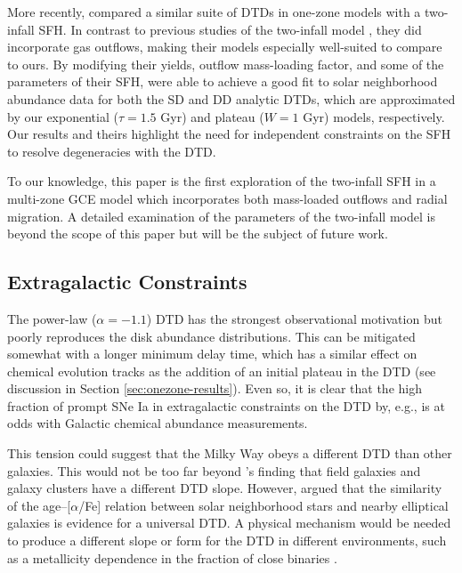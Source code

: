 \documentclass[twocolumn,twocolappendix]{aastex631}
\newcommand{\aFe}{[$\alpha$/Fe]\xspace}
\begin{document}
More recently, \citet{Palicio2023-AnalyticDTD} compared a similar suite of DTDs in one-zone models with a two-infall SFH. In contrast to previous studies of the two-infall model \citep[e.g.,][]{Chiappini1997-TwoInfall,Matteucci2009-DTDModels,Spitoni2021-TwoInfall}, they did incorporate gas outflows, making their models especially well-suited to compare to ours. By modifying their yields, outflow mass-loading factor, and some of the parameters of their SFH, \citet{Palicio2023-AnalyticDTD} were able to achieve a good fit to solar neighborhood abundance data for both the SD and DD analytic DTDs, which are approximated by our exponential ($\tau=1.5$ Gyr) and plateau ($W=1$ Gyr) models, respectively. Our results and theirs highlight the need for independent constraints on the SFH to resolve degeneracies with the DTD.

To our knowledge, this paper is the first exploration of the two-infall SFH in a multi-zone GCE model which incorporates both mass-loaded outflows and radial migration. A detailed examination of the parameters of the two-infall model is beyond the scope of this paper but will be the subject of future work.

\subsection{Extragalactic Constraints}

The power-law ($\alpha=-1.1$) DTD has the strongest observational motivation but poorly reproduces the disk abundance distributions. This can be mitigated somewhat with a longer minimum delay time, which has a similar effect on chemical evolution tracks as the addition of an initial plateau in the DTD (see discussion in Section \ref{sec:onezone-results}). Even so, it is clear that the high fraction of prompt SNe Ia in extragalactic constraints on the DTD by, e.g., \citet{Maoz2017-CosmicDTD} is at odds with Galactic chemical abundance measurements. 

This tension could suggest that the Milky Way obeys a different DTD than other galaxies. This would not be too far beyond \citeauthor{Maoz2017-CosmicDTD}'s \citeyearpar{Maoz2017-CosmicDTD} finding that field galaxies and galaxy clusters have a different DTD slope. However, \citet{Walcher2016-SelfSimilarity} argued that the similarity of the age--\aFe relation between solar neighborhood stars and nearby elliptical galaxies is evidence for a universal DTD. A physical mechanism would be needed to produce a different slope or form for the DTD in different environments, such as a metallicity dependence in the fraction of close binaries \citep[e.g.,][]{Moe2019-CloseBinaryFraction}.
\end{document}
